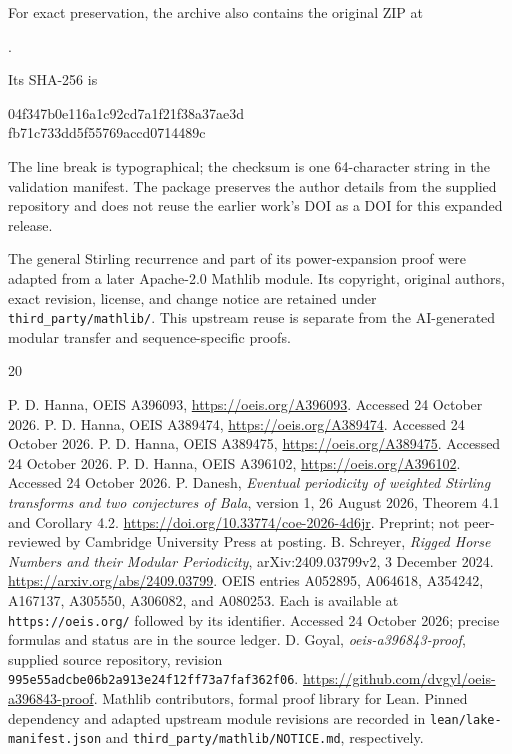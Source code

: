 \documentclass[11pt,a4paper]{article}
\theoremstyle{remark}
\begin{document}
For exact preservation, the archive also contains the original ZIP at
\begin{center}\small
{}.
\end{center}
Its SHA-256 is
\begin{center}\small\ttfamily
04f347b0e116a1c92cd7a1f21f38a37ae3d\\
fb71c733dd5f55769accd0714489c
\end{center}
The line break is typographical; the checksum is one 64-character string
in the validation manifest. The package preserves the author details
from the supplied repository and does not reuse the earlier work's DOI
as a DOI for this expanded release.

The general Stirling recurrence and part of its power-expansion proof
were adapted from a later Apache-2.0 Mathlib module. Its copyright,
original authors, exact revision, license, and change notice are
retained under \texttt{third\_party/mathlib/}. This upstream reuse is
separate from the AI-generated modular transfer and sequence-specific
proofs.

\clearpage
\begin{thebibliography}{20}
\raggedright
{} P. D. Hanna, OEIS A396093,
\url{https://oeis.org/A396093}. Accessed 24 October 2026.
 P. D. Hanna, OEIS A389474,
\url{https://oeis.org/A389474}. Accessed 24 October 2026.
 P. D. Hanna, OEIS A389475,
\url{https://oeis.org/A389475}. Accessed 24 October 2026.
 P. D. Hanna, OEIS A396102,
\url{https://oeis.org/A396102}. Accessed 24 October 2026.
 P. Danesh, \emph{Eventual periodicity of weighted
Stirling transforms and two conjectures of Bala}, version 1,
26 August 2026, Theorem 4.1 and Corollary 4.2.
\url{https://doi.org/10.33774/coe-2026-4d6jr}.
Preprint; not peer-reviewed by Cambridge University Press at posting.
 B. Schreyer, \emph{Rigged Horse Numbers and their
Modular Periodicity}, arXiv:2409.03799v2, 3 December 2024.
\url{https://arxiv.org/abs/2409.03799}.
 OEIS entries A052895, A064618, A354242,
A167137, A305550, A306082, and A080253. Each is available at
\texttt{https://oeis.org/} followed by its identifier. Accessed
24 October 2026; precise formulas and status are in the source ledger.
 D. Goyal, \emph{oeis-a396843-proof}, supplied source
repository, revision \texttt{995e55adcbe06b2a913e24f12ff73a7faf362f06}.
\url{https://github.com/dvgyl/oeis-a396843-proof}.
 Mathlib contributors, formal proof library for Lean.
Pinned dependency and adapted upstream module revisions are recorded
in \texttt{lean/lake-manifest.json} and
\texttt{third\_party/mathlib/NOTICE.md}, respectively.
\end{thebibliography}
\end{document}
